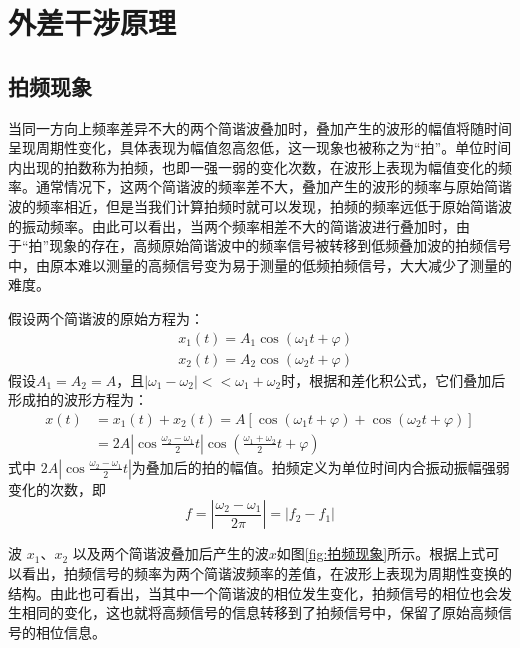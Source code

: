 \documentclass[type=master,oneside]{fduthesis}
\begin{document}
\section{外差干涉原理}
\subsection{拍频现象}
当同一方向上频率差异不大的两个简谐波叠加时，叠加产生的波形的幅值将随时间呈现周期性变化，具体表现为幅值忽高忽低，这一现象也被称之为“拍”。单位时间内出现的拍数称为拍频，也即一强一弱的变化次数，在波形上表现为幅值变化的频率。通常情况下，这两个简谐波的频率差不大，叠加产生的波形的频率与原始简谐波的频率相近，但是当我们计算拍频时就可以发现，拍频的频率远低于原始简谐波的振动频率。由此可以看出，当两个频率相差不大的简谐波进行叠加时，由于“拍”现象的存在，高频原始简谐波中的频率信号被转移到低频叠加波的拍频信号中，由原本难以测量的高频信号变为易于测量的低频拍频信号，大大减少了测量的难度。

假设两个简谐波的原始方程为：
\begin{equation}
  \begin{aligned}
     & x_{1}(t)=A_{1} \cos \left(\omega_{1} t+\varphi\right) \\
     & x_{2}(t)=A_{2} \cos \left(\omega_{2} t+\varphi\right)
  \end{aligned}
\end{equation}
假设$A_{1}=A_{2}=A$，且$|\omega_{1}-\omega_{2}|<<\omega_{1}+\omega_{2}$时，根据和差化积公式，它们叠加后形成拍的波形方程为：
\begin{equation}
  \begin{aligned}
    x(t) & =x_{1}(t)+x_{2}(t)=A\left[\cos \left(\omega_{1} t+\varphi\right)+\cos \left(\omega_{2} t+\varphi\right)\right]      \\
         & =2 A\left|\cos \frac{\omega_{2}-\omega_{1}}{2} t\right| \cos \left(\frac{\omega_{1}+\omega_{2}}{2} t+\varphi\right)
  \end{aligned}
\end{equation}
式中 $ 2A\left|\cos \frac{\omega_{2}-\omega_{1}}{2} t\right| $为叠加后的拍的幅值。拍频定义为单位时间内合振动振幅强弱变化的次数，即
\begin{equation}
  f=\left|\frac{\omega_{2}-\omega_{1}}{2 \pi}\right|=\left|f_{2}-f_{1}\right|
\end{equation}

波 $x_{1}$、$x_{2}$ 以及两个简谐波叠加后产生的波$x$如图\ref{fig:拍频现象}所示。根据上式可以看出，拍频信号的频率为两个简谐波频率的差值，在波形上表现为周期性变换的结构。由此也可看出，当其中一个简谐波的相位发生变化，拍频信号的相位也会发生相同的变化，这也就将高频信号的信息转移到了拍频信号中，保留了原始高频信号的相位信息\cite{张志平2022激光外差干涉技术在光刻机中的应用}。
\end{document}
